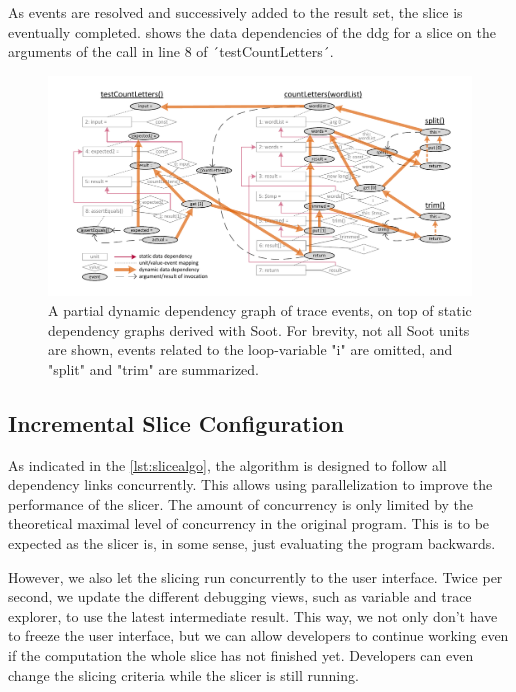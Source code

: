 As events are resolved and successively added to the result set, the slice is eventually completed.
 shows the data dependencies of the \ac{ddg} for a slice on the arguments of the call in line 8 of ´testCountLetters´.

\begin{figure}[tp]
\centering
\includegraphics[width=\linewidth, clip, trim=11mm 7mm 8mm 7mm]{img/graph_dynamic2}
\caption{A partial dynamic dependency graph of trace events, on top of static dependency graphs derived with Soot. For brevity, not all Soot units are shown, events related to the loop-variable "i" are omitted, and "split" and "trim" are summarized.}
\label{fig:graph_dynamic}
\end{figure}


\subsection{Incremental Slice Configuration}

\tmpStart

As indicated in the \cref{lst:slicealgo}, the algorithm is designed to follow all dependency links concurrently.
This allows using parallelization to improve the performance of the slicer.
The amount of concurrency is only limited by the theoretical maximal level of concurrency in the original program.
This is to be expected as the slicer is, in some sense, just evaluating the program backwards.

However, we also let the slicing run concurrently to the user interface.
Twice per second, we update the different debugging views, such as variable and trace explorer, to use the latest intermediate result.
This way, we not only don't have to freeze the user interface, but we can allow developers to continue working even if the computation the whole slice has not finished yet.
Developers can even change the slicing criteria while the slicer is still running.

